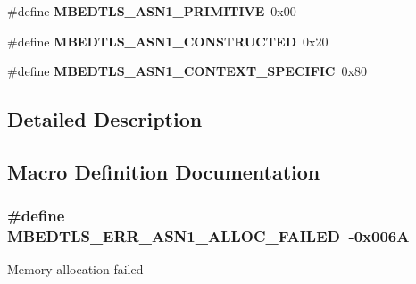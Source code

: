 \begin{DoxyCompactItemize}
\item 
\hypertarget{group__asn1__module_ga800aec91d6d124d917bb2707b246c551}{\#define {\bfseries M\-B\-E\-D\-T\-L\-S\-\_\-\-A\-S\-N1\-\_\-\-P\-R\-I\-M\-I\-T\-I\-V\-E}~0x00}\label{group__asn1__module_ga800aec91d6d124d917bb2707b246c551}

\item 
\hypertarget{group__asn1__module_ga8d855bf93e7f26e7c0c9c70af7f04d8e}{\#define {\bfseries M\-B\-E\-D\-T\-L\-S\-\_\-\-A\-S\-N1\-\_\-\-C\-O\-N\-S\-T\-R\-U\-C\-T\-E\-D}~0x20}\label{group__asn1__module_ga8d855bf93e7f26e7c0c9c70af7f04d8e}

\item 
\hypertarget{group__asn1__module_ga8d78fbb123ee982c80d8020050bf86e0}{\#define {\bfseries M\-B\-E\-D\-T\-L\-S\-\_\-\-A\-S\-N1\-\_\-\-C\-O\-N\-T\-E\-X\-T\-\_\-\-S\-P\-E\-C\-I\-F\-I\-C}~0x80}\label{group__asn1__module_ga8d78fbb123ee982c80d8020050bf86e0}

\end{DoxyCompactItemize}


\subsection{Detailed Description}


\subsection{Macro Definition Documentation}
\hypertarget{group__asn1__module_gab7d40360e48e414ffa1a4df1961723d2}{
\subsubsection[{M\-B\-E\-D\-T\-L\-S\-\_\-\-E\-R\-R\-\_\-\-A\-S\-N1\-\_\-\-A\-L\-L\-O\-C\-\_\-\-F\-A\-I\-L\-E\-D}]{\setlength{\rightskip}{0pt plus 5cm}\#define M\-B\-E\-D\-T\-L\-S\-\_\-\-E\-R\-R\-\_\-\-A\-S\-N1\-\_\-\-A\-L\-L\-O\-C\-\_\-\-F\-A\-I\-L\-E\-D~-\/0x006\-A}}\label{group__asn1__module_gab7d40360e48e414ffa1a4df1961723d2}
Memory allocation failed 

